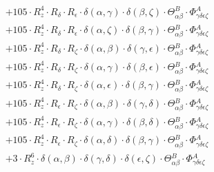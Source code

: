 \documentclass{article}
\begin{document}
\begin{equation}
\begin{array}{c}
 \\[0.2em] 		 + 105 \cdot R_{z}^{4} \cdot R_{\delta{}} \cdot R_{\epsilon{}} \cdot \delta{}\left(\alpha{}, \gamma{}\right) \cdot \delta{}\left(\beta{}, \zeta{}\right) \cdot \Theta{}^{B}_{\alpha{}\beta{}} \cdot \Phi{}^{A}_{\gamma{}\delta{}\epsilon{}\zeta{}} 
 \\[0.2em] 		 + 105 \cdot R_{z}^{4} \cdot R_{\delta{}} \cdot R_{\epsilon{}} \cdot \delta{}\left(\alpha{}, \zeta{}\right) \cdot \delta{}\left(\beta{}, \gamma{}\right) \cdot \Theta{}^{B}_{\alpha{}\beta{}} \cdot \Phi{}^{A}_{\gamma{}\delta{}\epsilon{}\zeta{}} 
 \\[0.2em] 		 + 105 \cdot R_{z}^{4} \cdot R_{\delta{}} \cdot R_{\zeta{}} \cdot \delta{}\left(\alpha{}, \beta{}\right) \cdot \delta{}\left(\gamma{}, \epsilon{}\right) \cdot \Theta{}^{B}_{\alpha{}\beta{}} \cdot \Phi{}^{A}_{\gamma{}\delta{}\epsilon{}\zeta{}} 
 \\[0.2em] 		 + 105 \cdot R_{z}^{4} \cdot R_{\delta{}} \cdot R_{\zeta{}} \cdot \delta{}\left(\alpha{}, \gamma{}\right) \cdot \delta{}\left(\beta{}, \epsilon{}\right) \cdot \Theta{}^{B}_{\alpha{}\beta{}} \cdot \Phi{}^{A}_{\gamma{}\delta{}\epsilon{}\zeta{}} 
 \\[0.2em] 		 + 105 \cdot R_{z}^{4} \cdot R_{\delta{}} \cdot R_{\zeta{}} \cdot \delta{}\left(\alpha{}, \epsilon{}\right) \cdot \delta{}\left(\beta{}, \gamma{}\right) \cdot \Theta{}^{B}_{\alpha{}\beta{}} \cdot \Phi{}^{A}_{\gamma{}\delta{}\epsilon{}\zeta{}} 
 \\[0.2em] 		 + 105 \cdot R_{z}^{4} \cdot R_{\epsilon{}} \cdot R_{\zeta{}} \cdot \delta{}\left(\alpha{}, \beta{}\right) \cdot \delta{}\left(\gamma{}, \delta{}\right) \cdot \Theta{}^{B}_{\alpha{}\beta{}} \cdot \Phi{}^{A}_{\gamma{}\delta{}\epsilon{}\zeta{}} 
 \\[0.2em] 		 + 105 \cdot R_{z}^{4} \cdot R_{\epsilon{}} \cdot R_{\zeta{}} \cdot \delta{}\left(\alpha{}, \gamma{}\right) \cdot \delta{}\left(\beta{}, \delta{}\right) \cdot \Theta{}^{B}_{\alpha{}\beta{}} \cdot \Phi{}^{A}_{\gamma{}\delta{}\epsilon{}\zeta{}} 
 \\[0.2em] 		 + 105 \cdot R_{z}^{4} \cdot R_{\epsilon{}} \cdot R_{\zeta{}} \cdot \delta{}\left(\alpha{}, \delta{}\right) \cdot \delta{}\left(\beta{}, \gamma{}\right) \cdot \Theta{}^{B}_{\alpha{}\beta{}} \cdot \Phi{}^{A}_{\gamma{}\delta{}\epsilon{}\zeta{}} 
 \\[0.2em] 		 + 3 \cdot R_{z}^{6} \cdot \delta{}\left(\alpha{}, \beta{}\right) \cdot \delta{}\left(\gamma{}, \delta{}\right) \cdot \delta{}\left(\epsilon{}, \zeta{}\right) \cdot \Theta{}^{B}_{\alpha{}\beta{}} \cdot \Phi{}^{A}_{\gamma{}\delta{}\epsilon{}\zeta{}} 

\end{array}
\end{equation}
\end{document}
